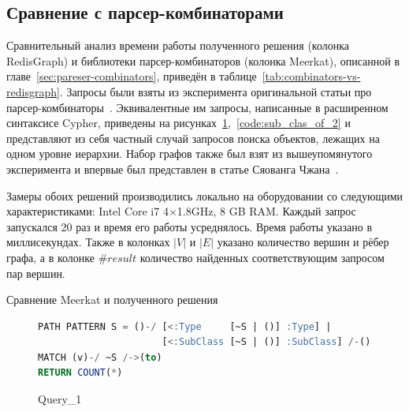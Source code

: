 \documentclass[14pt]{matmex-diploma-custom}
\newcommand{\gsv}[1]{\textcolor{red}{#1$^{\text{gsv}}$}}
\begin{document}
\subsection{Сравнение с парсер-комбинаторами}\label{sec:parse-comp-compare}
Сравнительный анализ времени работы полученного решения (колонка RedisGraph) и библиотеки парсер-комбинаторов (колонка Meer\-kat), описанной в главе~\ref{sec:pareser-combinators}, приведён в таблице~\ref{tab:combinators-vs-redisgraph}. Запросы были взяты из эксперимента оригинальной статьи про парсер-комбинаторы~\cite{parser-combinators}. Эквивалентные им запросы, написанные в расширенном синтаксисе Cyp\-her, приведены на рисунках~\ref{code:sub_clas_of_1},~\ref{code:sub_clas_of_2} и представляют из себя частный случай запросов поиска объектов, лежащих на одном уровне иерархии. Набор графов также был взят из вышеупомянутого эксперимента и впервые был представлен в статье Сяованга Чжана~\cite{zhlang-2016}.


Замеры обоих решений производились локально на оборудовании со следующими характеристиками: Intel Core i7 4$\times$1.8GHz, 8 GB RAM. Каждый запрос запускался 20 раз и время его работы усреднялось. Время работы указано в миллисекундах. Также в колонках $|V|$ и $|E|$ указано количество вершин и рёбер графа, а в колонке $\#result$ количество найденных соответствующим запросом пар вершин. 

\begin{table}[h!]
\begin{adjustbox}{max width=\textwidth}

\end{adjustbox}
\caption{Сравнение Meerkat и полученного решения}
\label{tab:combinators-vs-redisgraph}
\end{table}

\begin{figure}[h!]
\begin{adjustbox}{max width=\textwidth}
\begin{lstlisting}[language=sql]
PATH PATTERN S = ()-/ [<:Type     [~S | ()] :Type] | 
                      [<:SubClass [~S | ()] :SubClass] /-()
MATCH (v)-/ ~S /->(to)
RETURN COUNT(*)
\end{lstlisting}
\end{adjustbox}
\caption{Query\_1}
\label{code:sub_clas_of_1}
\end{figure}
\end{document}
